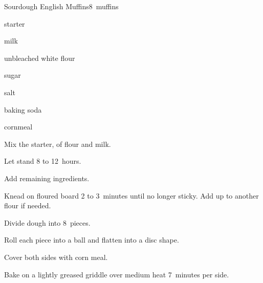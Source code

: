 \begin{recipe}{Sourdough English Muffins}{}{8~muffins}

\begin{ingredients}
\item {} starter
\item {} milk
\item \C{2\half} unbleached white flour
\item {} sugar
\item \tp{\threequarter} salt
\item \tp{\half} baking soda
\item cornmeal
\end{ingredients}

\begin{directions}
\item Mix the starter,  of flour and milk.
\item Let stand 8 to 12~hours.
\item Add remaining ingredients.
\item Knead on floured board 2 to 3~minutes until no longer sticky. Add up to another \C{\quarter} flour if needed.
\item Divide dough into 8~pieces.
\item Roll each piece into a ball and flatten into a disc shape.
\item Cover both sides with corn meal.
\item Bake on a lightly greased griddle over medium heat 7~minutes per side.
\end{directions}

\end{recipe}
